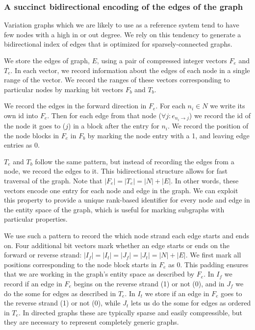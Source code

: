 \documentclass[12pt]{article}
\begin{document}
\subsubsection{A succinct bidirectional encoding of the edges of the graph}

Variation graphs which we are likely to use as a reference system tend to have few nodes with a high in or out degree.
We rely on this tendency to generate a bidirectional index of edges that is optimized for sparsely-connected graphs.

We store the edges of graph, $E$, using a pair of compressed integer vectors $F_e$ and $T_e$.
In each vector, we record information about the edges of each node in a single range of the vector.
We record the ranges of these vectors corresponding to particular nodes by marking bit vectors $F_b$ and $T_b$.

We record the edges in the forward direction in $F_e$.
For each $n_i \in N$ we write its own id into $F_e$.
Then for each edge from that node ($\forall j : e_{n_i \rightarrow j}$) we record the id of the node it goes to ($j$) in a block after the entry for $n_i$.
We record the position of the node blocks in $F_e$ in $F_b$ by marking the node entry with a 1, and leaving edge entries as 0.

$T_e$ and $T_b$ follow the same pattern, but instead of recording the edges from a node, we record the edges to it.
This bidirectional structure allows for fast traversal of the graph.
Note that $|F_e| = |T_e| = |N| + |E|$.
In other words, these vectors encode one entry for each node and edge in the graph.
We can exploit this property to provide a unique rank-based identifier for every node and edge in the entity space of the graph, which is useful for marking subgraphs with particular properties.

We use such a pattern to record the which node strand each edge starts and ends on.
Four additional bit vectors mark whether an edge starts or ends on the forward or reverse strand: $|I_f| = |I_t| = |J_f| = |J_t| = |N| + |E|$.
We first mark all positions corresponding to the node block starts in $F_e$ as 0.
This padding ensures that we are working in the graph's entity space as described by $F_e$.
In $I_f$ we record if an edge in $F_e$ begins on the reverse strand (1) or not (0), and in $J_f$ we do the some for edges as described in $T_e$.
In $I_t$ we store if an edge in $F_e$ goes to the reverse strand (1) or not (0), while $J_t$ lets us do the some for edges as ordered in $T_e$.
In directed graphs these are typically sparse and easily compressible, but they are necessary to represent completely generic graphs.
\end{document}
